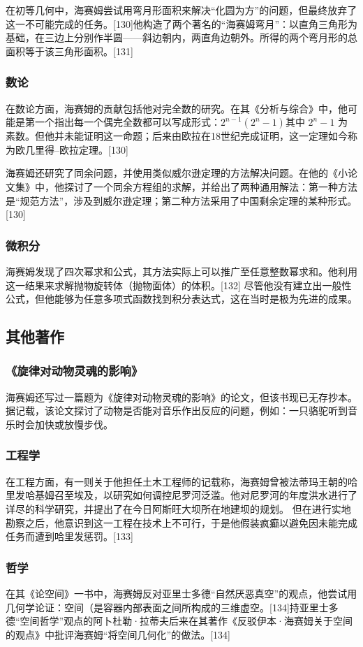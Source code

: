 在初等几何中，海赛姆尝试用弯月形面积来解决“化圆为方”的问题，但最终放弃了这一不可能完成的任务。[130]他构造了两个著名的“海赛姆弯月”：以直角三角形为基础，在三边上分别作半圆——斜边朝内，两直角边朝外。所得的两个弯月形的总面积等于该三角形面积。[131]
\subsubsection{数论}
在数论方面，海赛姆的贡献包括他对完全数的研究。在其《分析与综合》中，他可能是第一个指出每一个偶完全数都可以写成形式：$2^{n-1}(2^n - 1)$其中 $2^n - 1$ 为素数。但他并未能证明这一命题；后来由欧拉在18世纪完成证明，这一定理如今称为欧几里得–欧拉定理。[130]

海赛姆还研究了同余问题，并使用类似威尔逊定理的方法解决问题。在他的《小论文集》中，他探讨了一个同余方程组的求解，并给出了两种通用解法：第一种方法是“规范方法”，涉及到威尔逊定理；第二种方法采用了中国剩余定理的某种形式。[130]
\subsubsection{微积分}
海赛姆发现了四次幂求和公式，其方法实际上可以推广至任意整数幂求和。他利用这一结果来求解抛物旋转体（抛物面体）的体积。[132]
尽管他没有建立出一般性公式，但他能够为任意多项式函数找到积分表达式，这在当时是极为先进的成果。
\subsection{其他著作}
\subsubsection{《旋律对动物灵魂的影响》}
海赛姆还写过一篇题为《旋律对动物灵魂的影响》的论文，但该书现已无存抄本。据记载，该论文探讨了动物是否能对音乐作出反应的问题，例如：一只骆驼听到音乐时会加快或放慢步伐。
\subsubsection{工程学}
在工程方面，有一则关于他担任土木工程师的记载称，海赛姆曾被法蒂玛王朝的哈里发哈基姆召至埃及，以研究如何调控尼罗河泛滥。他对尼罗河的年度洪水进行了详尽的科学研究，并提出了在今日阿斯旺大坝所在地建坝的规划。
但在进行实地勘察之后，他意识到这一工程在技术上不可行，于是他假装疯癫以避免因未能完成任务而遭到哈里发惩罚。[133]
\subsubsection{哲学}
在其《论空间》一书中，海赛姆反对亚里士多德“自然厌恶真空”的观点，他尝试用几何学论证：空间（是容器内部表面之间所构成的三维虚空。[134]持亚里士多德“空间哲学”观点的阿卜杜勒·拉蒂夫后来在其著作《反驳伊本·海赛姆关于空间的观点》中批评海赛姆“将空间几何化”的做法。[134]

